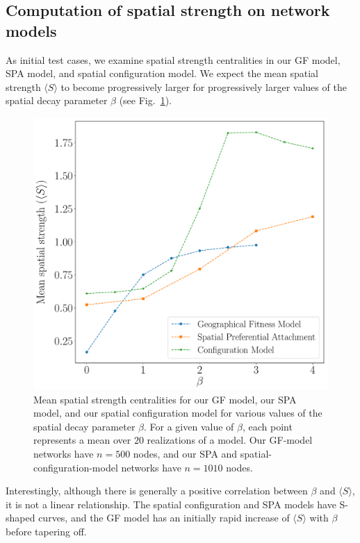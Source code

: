 \documentclass[%
 reprint,
 amsmath,amssymb,
 aps,
]{revtex4-1}
\begin{document}

\subsection{Computation of spatial strength on network models}\label{sec:computed_ss}

As initial test cases, we examine spatial strength centralities in our GF model, SPA model, and spatial configuration model. We expect the mean spatial strength $\langle S \rangle$ to become progressively larger for progressively larger values of the spatial decay parameter $\beta$ (see Fig.~\ref{fig:spatial_model_strength}).


\begin{figure}
    \centering
    \includegraphics[width=1.0\linewidth]{spatial_model_spatial_strengths2.pdf}
    \caption{Mean spatial strength centralities for our GF model, our SPA model, and our spatial configuration model for various values of the spatial decay parameter $\beta$. For a given value of $\beta$, each point represents a mean over $20$ realizations of a model. Our GF-model networks have $n=500$ nodes, and our SPA and spatial-configuration-model networks have $n=1010$ nodes.
    }
    \label{fig:spatial_model_strength}
\end{figure}


Interestingly, although there is generally a positive correlation between $\beta$ and $\langle S \rangle$, it is not a linear relationship. The spatial configuration and SPA models have S-shaped curves, and the GF model has an initially rapid increase of $\langle S \rangle$ with $\beta$ before tapering off.
\end{document}
